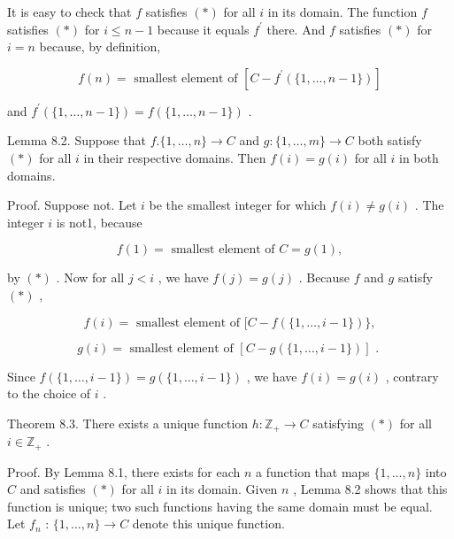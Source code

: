 It is easy to check that \(f\) satisfies \(\left( *\right)\) for all \(i\) in its domain. The function \(f\) satisfies \(\left( *\right)\) for \(i \leq  n - 1\) because it equals \({f}^{\prime }\) there. And \(f\) satisfies \(\left( *\right)\) for \(i = n\) because, by definition,

\[
f\left( n\right)  = \text{ smallest element of }\left\lbrack  {C - {f}^{\prime }\left( {\{ 1,\ldots ,n - 1\} }\right) }\right\rbrack
\]

and \({f}^{\prime }\left( {\{ 1,\ldots ,n - 1\} }\right)  = f\left( {\{ 1,\ldots ,n - 1\} }\right)\) .

Lemma 8.2. Suppose that \(f.\{ 1,\ldots ,n\}  \rightarrow  C\) and \(g : \{ 1,\ldots ,m\}  \rightarrow  C\) both satisfy \(\left( *\right)\) for all \(i\) in their respective domains. Then \(f\left( i\right)  = g\left( i\right)\) for all \(i\) in both domains.

Proof. Suppose not. Let \(i\) be the smallest integer for which \(f\left( i\right)  \neq  g\left( i\right)\) . The integer \(i\) is not1, because

\[
f\left( 1\right)  = \text{ smallest element of }C = g\left( 1\right) ,
\]

by \(\left( *\right)\) . Now for all \(j < i\) , we have \(f\left( j\right)  = g\left( j\right)\) . Because \(f\) and \(g\) satisfy \(\left( *\right)\) ,

\[
f\left( i\right)  = \text{ smallest element of }\lbrack C - f\left( {\{ 1,\ldots ,i - 1\} }\right) \} ,
\]

\[
g\left( i\right)  = \text{ smallest element of }\left\lbrack  {C - g\left( {\{ 1,\ldots ,i - 1\} }\right) }\right\rbrack  \text{ . }
\]

Since \(f\left( {\{ 1,\ldots ,i - 1\} }\right)  = g\left( {\{ 1,\ldots ,i - 1\} }\right)\) , we have \(f\left( i\right)  = g\left( i\right)\) , contrary to the choice of \(i\) .

Theorem 8.3. There exists a unique function \(h : {\mathbb{Z}}_{ + } \rightarrow  C\) satisfying \(\left( *\right)\) for all \(i \in  {\mathbb{Z}}_{ + }\) .

Proof. By Lemma 8.1, there exists for each \(n\) a function that maps \(\{ 1,\ldots ,n\}\) into \(C\) and satisfies \(\left( *\right)\) for all \(i\) in its domain. Given \(n\) , Lemma 8.2 shows that this function is unique; two such functions having the same domain must be equal. Let \({f}_{n}\) : \(\{ 1,\ldots ,n\}  \rightarrow  C\) denote this unique function.

